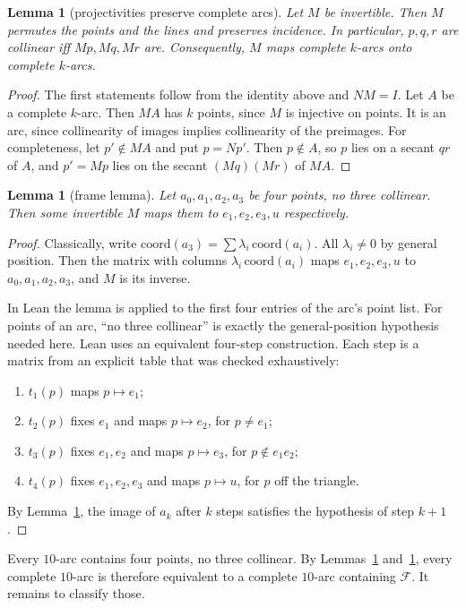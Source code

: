 \documentclass[11pt]{article}
\newtheorem{lemma}[theorem]{Lemma}
\theoremstyle{definition}
\theoremstyle{remark}
\begin{document}
\begin{lemma}[projectivities preserve complete arcs]\label{lem:preserve}
Let $M$ be invertible. Then $M$ permutes the points and the lines and
preserves incidence. In particular, $p,q,r$ are collinear iff $Mp,Mq,Mr$ are.
Consequently, $M$ maps complete $k$-arcs onto complete $k$-arcs.
\end{lemma}
\begin{proof}
The first statements follow from the identity above and $NM=I$. Let $A$ be a
complete $k$-arc. Then $MA$ has $k$ points, since $M$ is injective on points.
It is an arc, since collinearity of images implies collinearity of the
preimages. For completeness, let $p'\notin MA$ and put $p=Np'$. Then $p\notin
A$, so $p$ lies on a secant $qr$ of $A$, and $p'=Mp$ lies on the secant
$(Mq)(Mr)$ of $MA$.
\end{proof}

\begin{lemma}[frame lemma]\label{lem:frame}
Let $a_0,a_1,a_2,a_3$ be four points, no three collinear. Then some invertible
$M$ maps them to $e_1,e_2,e_3,u$ respectively.
\end{lemma}
\begin{proof}
Classically, write $\mathrm{coord}(a_3)=\sum\lambda_i\,\mathrm{coord}(a_i)$.
All $\lambda_i\neq0$ by general position. Then the matrix with columns
$\lambda_i\,\mathrm{coord}(a_i)$ maps $e_1,e_2,e_3,u$ to $a_0,a_1,a_2,a_3$, and
$M$ is its inverse.

In Lean the lemma is applied to the first four entries of the arc's point list. For points of an arc, ``no three collinear'' is exactly the general-position hypothesis needed here. Lean uses an equivalent four-step construction. Each step is a matrix from
an explicit table that was checked exhaustively:
\begin{enumerate}
\item $t_1(p)$ maps $p\mapsto e_1$;
\item $t_2(p)$ fixes $e_1$ and maps $p\mapsto e_2$, for $p\neq e_1$;
\item $t_3(p)$ fixes $e_1,e_2$ and maps $p\mapsto e_3$, for $p\notin e_1e_2$;
\item $t_4(p)$ fixes $e_1,e_2,e_3$ and maps $p\mapsto u$, for $p$ off the
triangle.
\end{enumerate}
By Lemma~\ref{lem:preserve}, the image of $a_{k}$ after $k$ steps satisfies the
hypothesis of step $k+1$.
\end{proof}

Every $10$-arc contains four points, no three collinear. By
Lemmas~\ref{lem:preserve} and~\ref{lem:frame}, every complete $10$-arc is
therefore equivalent to a complete $10$-arc containing $\mathcal F$. It
remains to classify those.
\end{document}
